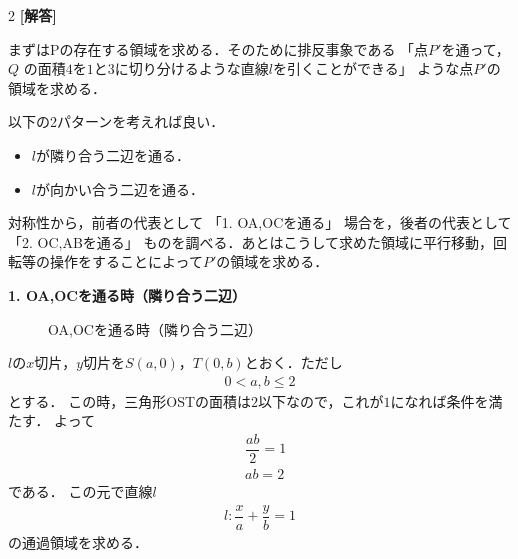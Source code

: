 \documentclass[../../main.tex]{subfiles}
\begin{document}
\setcounter{equation}{0}
\begin{oframed}
  
\end{oframed}
\setlength{\columnseprule}{0.4pt}
\begin{multicols}{2}
  {\bf [解答]}

  まずはPの存在する領域を求める．そのために排反事象である
  「点$P'$を通って，$Q$ の面積$4$を$1$と$3$に切り分けるような直線$l$を引くことができる」
  ような点$P'$の領域を求める．

  以下の2パターンを考えれば良い．
  \begin{itemize}
    \item $l$が隣り合う二辺を通る．
    \item $l$が向かい合う二辺を通る．
  \end{itemize}

  対称性から，前者の代表として
  「1. OA,OCを通る」
  場合を，後者の代表として
  「2. OC,ABを通る」
  ものを調べる．あとはこうして求めた領域に平行移動，回転等の操作をすることによって$P'$の領域を求める．

  \textbf{1. OA,OCを通る時（隣り合う二辺）}

  \begin{figure}[H]
    \centering
    \caption{OA,OCを通る時（隣り合う二辺）}
    \label{1990-1:fig:1}
  \end{figure}

  $l$の$x$切片，$y$切片を$S(a,0)$，$T(0,b)$とおく．ただし
  \begin{align}
    0<a,b \le 2 \label{eq:1}
  \end{align}
  とする．
  この時，三角形OSTの面積は$2$以下なので，これが$1$になれば条件を満たす．
  よって
  \begin{align}
    & \dfrac{ab}{2} = 1         \\
    & ab=2 \label{eq:2}
  \end{align}
  である．
  この元で直線$l$
  \begin{align}
    l: \dfrac{x}{a}+\dfrac{y}{b}=1
  \end{align}
  の通過領域を求める．


\end{multicols}
\end{document}
